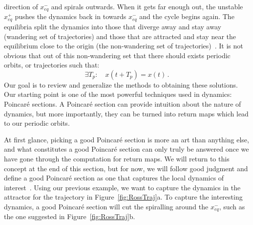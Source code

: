 \documentclass[12 pt]{article}
\begin{document}
direction of $x_{eq}^{-}$ and spirals outwards.  When it gets far enough
out, the unstable $x_{eq}^{+}$ pushes the dynamics back in towards
$x_{eq}^{-}$ and the cycle begins again.  The equilibria split the
dynamics into those that diverge away and stay away (wandering set of
trajectories) and those that are attracted and stay near the equilibrium
close to the origin (the non-wandering set of trajectories)~\cite{CB}. It
is not obvious that out of this non-wandering set that there should
exists periodic orbits, or trajectories such that:
\begin{equation}
\exists T_p : \quad  x(t+T_p) = x(t) \,.
  \label{eq:PerTraj}
\end{equation}
Our goal is to review and generalize the methods to obtaining these
solutions.  Our starting point is one of the most powerful techniques
used in dynamics: Poincar\'e sections.  A Poincar\'e section can provide
intuition about the nature of dynamics, but more importantly, they can be
turned into return maps which lead to our periodic orbits.

At first glance, picking a good Poincar\'e section is more an art than
anything else, and what constitutes a good Poincar\'e section can only
truly be answered once we have gone through the computation for return
maps.  We will return to this concept at the end of this section, but for
now, we will follow good judgment and define a good Poincar\'e section as
one that captures the local dynamics of interest~\cite{CB}.  Using our
previous example, we want to capture the dynamics in the attractor for
the trajectory in Figure~\ref{fig:RossTraj}a.  To capture the interesting
dynamics, a good Poincar\'e section will cut the spiralling around the
$x_{eq}^{-}$, such as the one suggested in Figure~\ref{fig:RossTraj}b.
\end{document}
